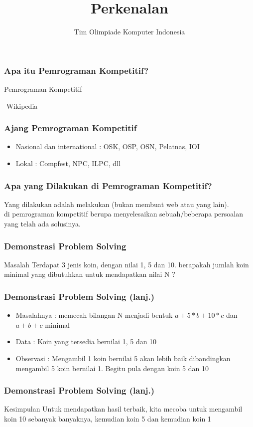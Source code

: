 

\title{Perkenalan}
\author{Tim Olimpiade Komputer Indonesia}
\date{}



\begin{frame}
\titlepage
\end{frame}

\begin{frame}
\frametitle{Apa itu Pemrograman Kompetitif?}
\begin{block}{Pemrograman Kompetitif}

-Wikipedia-
\end{block}
\end{frame}

\begin{frame}
\frametitle{Ajang Pemrograman Kompetitif}
\begin{itemize}
  \item Nasional dan international : OSK, OSP, OSN, Pelatnas, IOI
  \item Lokal : Compfest, NPC, ILPC, dll
\end{itemize}

\end{frame}

\begin{frame}
\frametitle{Apa yang Dilakukan di Pemrograman Kompetitif?}
Yang dilakukan adalah melakukan  (bukan membuat web atau yang lain).
\\
 di pemrograman kompetitif berupa menyelesaikan sebuah/beberapa persoalan yang telah ada solusinya.
\end{frame}

\begin{frame}
\frametitle{Demonstrasi Problem Solving}
\begin{block}{Masalah}
Terdapat 3 jenis koin, dengan nilai 1, 5 dan 10.
berapakah jumlah koin minimal yang dibutuhkan untuk mendapatkan nilai N ?
\end{block}
\end{frame}

\begin{frame}
\frametitle{Demonstrasi Problem Solving (lanj.)}
\begin{itemize}
  \item Masalahnya : memecah bilangan N menjadi bentuk $a + 5 * b + 10 * c$ dan $a + b + c$ minimal
  \item Data : Koin yang tersedia bernilai 1, 5 dan 10
  \item Observasi : Mengambil 1 koin bernilai 5 akan lebih baik dibandingkan mengambil 5 koin bernilai 1. Begitu pula dengan koin 5 dan 10
\end{itemize}
\end{frame}

\begin{frame}
\frametitle{Demonstrasi Problem Solving (lanj.)}
\begin{block}{Kesimpulan}
Untuk mendapatkan hasil terbaik, kita mecoba untuk mengambil koin 10 sebanyak banyaknya, kemudian koin 5 dan kemudian koin 1
\end{block}
\end{frame}


